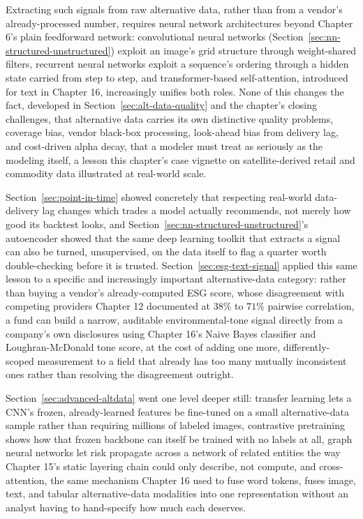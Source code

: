 \documentclass[../ai_in_finance]{subfiles}
\begin{document}
Extracting such signals from raw alternative data, rather than from a vendor's already-processed number, requires neural network architectures beyond Chapter 6's plain feedforward network: convolutional neural networks (Section~\ref{sec:nn-structured-unstructured}) exploit an image's grid structure through weight-shared filters, recurrent neural networks exploit a sequence's ordering through a hidden state carried from step to step, and transformer-based self-attention, introduced for text in Chapter 16, increasingly unifies both roles. None of this changes the fact, developed in Section~\ref{sec:alt-data-quality} and the chapter's closing challenges, that alternative data carries its own distinctive quality problems, coverage bias, vendor black-box processing, look-ahead bias from delivery lag, and cost-driven alpha decay, that a modeler must treat as seriously as the modeling itself, a lesson this chapter's case vignette on satellite-derived retail and commodity data illustrated at real-world scale.

Section~\ref{sec:point-in-time} showed concretely that respecting real-world data-delivery lag changes which trades a model actually recommends, not merely how good its backtest looks, and Section~\ref{sec:nn-structured-unstructured}'s autoencoder showed that the same deep learning toolkit that extracts a signal can also be turned, unsupervised, on the data itself to flag a quarter worth double-checking before it is trusted. Section~\ref{sec:esg-text-signal} applied this same lesson to a specific and increasingly important alternative-data category: rather than buying a vendor's already-computed ESG score, whose disagreement with competing providers Chapter 12 documented at $38\%$ to $71\%$ pairwise correlation, a fund can build a narrow, auditable environmental-tone signal directly from a company's own disclosures using Chapter 16's Naive Bayes classifier and Loughran-McDonald tone score, at the cost of adding one more, differently-scoped measurement to a field that already has too many mutually inconsistent ones rather than resolving the disagreement outright.

Section~\ref{sec:advanced-altdata} went one level deeper still: transfer learning lets a CNN's frozen, already-learned features be fine-tuned on a small alternative-data sample rather than requiring millions of labeled images, contrastive pretraining shows how that frozen backbone can itself be trained with no labels at all, graph neural networks let risk propagate across a network of related entities the way Chapter 15's static layering chain could only describe, not compute, and cross-attention, the same mechanism Chapter 16 used to fuse word tokens, fuses image, text, and tabular alternative-data modalities into one representation without an analyst having to hand-specify how much each deserves.
\end{document}
